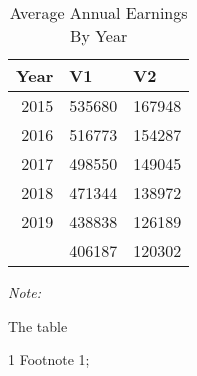 \begin{table}
\centering
\caption{Average Annual Earnings By Year}
\centering
\begin{threeparttable}
\begin{tabular}[t]{rll}
\toprule
Year & V1 & V2\\
\midrule
2015 & 535680 & 167948\\
2016 & 516773 & 154287\\
2017 & 498550 & 149045\\
2018 & 471344 & 138972\\
2019 & 438838 & 126189\\
\addlinespace
2020 & 406187 & 120302\\
\bottomrule
\end{tabular}
\begin{tablenotes}
\item \textit{Note: } 
\item The table
\item[1] Footnote 1; 
\end{tablenotes}
\end{threeparttable}
\end{table}
